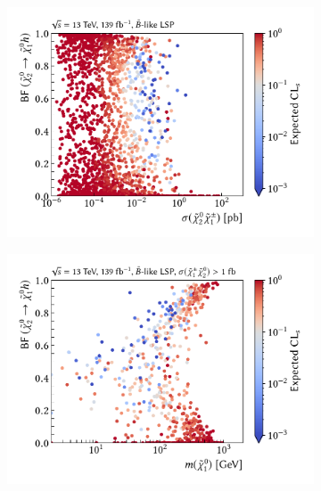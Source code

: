  \begin{figure}
	\centering
	\begin{subfigure}[b]{0.5\linewidth}
		\centering\includegraphics[width=\textwidth]{scatter/fig_scatter_xsec_BFHiggs_bino}
		\vspace{-2em}
		\caption{\label{fig:fig_scatter_xsec_BFHiggs_bino}}
	\end{subfigure}\hfill
	\begin{subfigure}[b]{0.5\linewidth}
		\centering\includegraphics[width=\textwidth]{scatter/fig_scatter_mchi10_BFHiggs_bino_withXsecCut}
		\vspace{-2em}
		\caption{\label{fig:fig_scatter_mchi10_BFHiggs_bino_withXsecCut}}
	\end{subfigure}\hfill

\end{figure}
